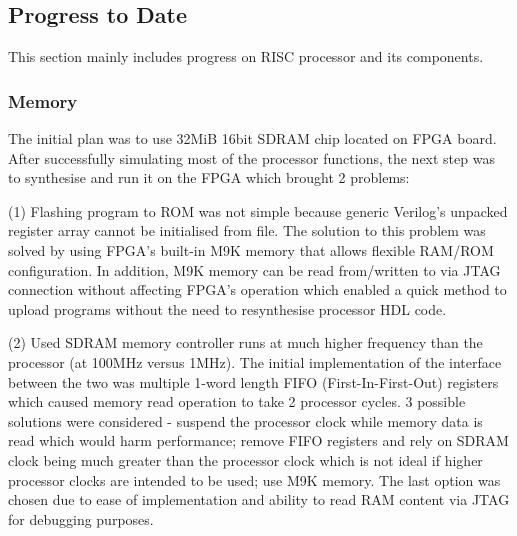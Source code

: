 \documentclass[a4paper,12pt]{article}
\begin{document}
\begin{multicols}{2}

\subsection{Progress to Date}
This section mainly includes progress on RISC processor and its components.

\subsubsection{Memory} \label{sec:memory}
The initial plan was to use 32MiB 16bit SDRAM chip located on FPGA board. After successfully simulating most of the processor functions, the next step was to synthesise and run it on the FPGA which brought 2 problems: 

(1) Flashing program to ROM was not simple because generic Verilog's unpacked register array cannot be initialised from file. The solution to this problem was solved by using FPGA's built-in M9K memory that allows flexible RAM/ROM configuration. In addition, M9K memory can be read from/written to via JTAG connection without affecting FPGA's operation which enabled a quick method to upload programs without the need to resynthesise processor HDL code.

(2) Used SDRAM memory controller runs at much higher frequency than the processor (at 100MHz versus 1MHz). The initial implementation of the interface between the two was multiple 1-word length FIFO (First-In-First-Out) registers which caused memory read operation to take 2 processor cycles. 3 possible solutions were considered - suspend the processor clock while memory data is read which would harm performance; remove FIFO registers and rely on SDRAM clock being much greater than the processor clock which is not ideal if higher processor clocks are intended to be used; use M9K memory. The last option was chosen due to ease of implementation and ability to read RAM content via JTAG for debugging purposes.


\end{multicols}
\end{document}
